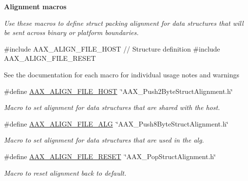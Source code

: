 \begin{Indent}{\bf Alignment macros}\par
{\em Use these macros to define struct packing alignment for data structures that will be sent across binary or platform boundaries.


\begin{DoxyCode}
\textcolor{preprocessor}{#include AAX\_ALIGN\_FILE\_HOST}
    \textcolor{comment}{// Structure definition}
\textcolor{preprocessor}{#include AAX\_ALIGN\_FILE\_RESET}
\end{DoxyCode}


See the documentation for each macro for individual usage notes and warnings }\begin{DoxyCompactItemize}
\item 
\#define \hyperlink{a00149_acbef7ed7d077bc9812cb56417e1ad325}{A\+A\+X\+\_\+\+A\+L\+I\+G\+N\+\_\+\+F\+I\+L\+E\+\_\+\+H\+O\+S\+T}~\char`\"{}A\+A\+X\+\_\+\+Push2\+Byte\+Struct\+Alignment.\+h\char`\"{}
\begin{DoxyCompactList}\small\item\em Macro to set alignment for data structures that are shared with the host. \end{DoxyCompactList}\item 
\#define \hyperlink{a00149_a8fbeac3c5db5ac694e85a021ed74dc9e}{A\+A\+X\+\_\+\+A\+L\+I\+G\+N\+\_\+\+F\+I\+L\+E\+\_\+\+A\+L\+G}~\char`\"{}A\+A\+X\+\_\+\+Push8\+Byte\+Struct\+Alignment.\+h\char`\"{}
\begin{DoxyCompactList}\small\item\em Macro to set alignment for data structures that are used in the alg. \end{DoxyCompactList}\item 
\#define \hyperlink{a00149_a8aaaefcc3d87025e84d5ccb99b650a87}{A\+A\+X\+\_\+\+A\+L\+I\+G\+N\+\_\+\+F\+I\+L\+E\+\_\+\+R\+E\+S\+E\+T}~\char`\"{}A\+A\+X\+\_\+\+Pop\+Struct\+Alignment.\+h\char`\"{}
\begin{DoxyCompactList}\small\item\em Macro to reset alignment back to default. \end{DoxyCompactList}\end{DoxyCompactItemize}
\end{Indent}
